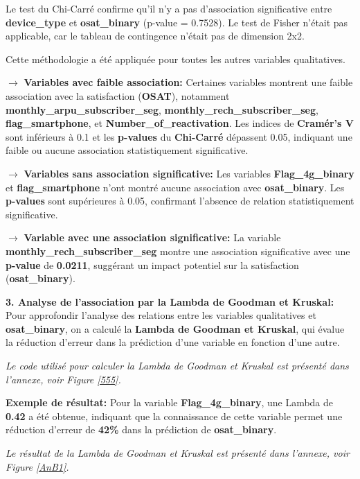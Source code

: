 Le test du Chi-Carré confirme qu'il n'y a pas d'association significative entre \textbf{device\_type} et \textbf{osat\_binary} (p-value = 0.7528). Le test de Fisher n'était pas applicable, car le tableau de contingence n'était pas de dimension 2x2.

Cette méthodologie a été appliquée pour toutes les autres variables qualitatives.

\textbf{\(\rightarrow\)} \textbf{Variables avec faible association:} Certaines variables montrent une faible association avec la satisfaction (\textbf{OSAT}), notamment \textbf{monthly\_arpu\_subscriber\_seg}, \textbf{monthly\_rech\_subscriber\_seg}, \textbf{flag\_smartphone}, et \textbf{Number\_of\_reactivation}. Les indices de \textbf{Cramér's V} sont inférieurs à 0.1 et les \textbf{p-values} du \textbf{Chi-Carré} dépassent 0.05, indiquant une faible ou aucune association statistiquement significative.


\textbf{\(\rightarrow\)} \textbf{Variables sans association significative:} Les variables \textbf{Flag\_4g\_binary} et \textbf{flag\_smartphone} n’ont montré aucune association avec \textbf{osat\_binary}. Les \textbf{p-values} sont supérieures à 0.05, confirmant l'absence de relation statistiquement significative.

\textbf{\(\rightarrow\)} \textbf{Variable avec une association significative:} La variable \textbf{monthly\_rech\_subscriber\_seg} montre une association significative avec une \textbf{p-value} de \textbf{0.0211}, suggérant un impact potentiel sur la satisfaction (\textbf{osat\_binary}).\par

\textbf{3. Analyse de l'association par la Lambda de Goodman et Kruskal:} Pour approfondir l'analyse des relations entre les variables qualitatives et \textbf{osat\_binary}, on a calculé la \textbf{Lambda de Goodman et Kruskal}, qui évalue la réduction d'erreur dans la prédiction d'une variable en fonction d'une autre.

\textit{Le code utilisé pour calculer la Lambda de Goodman et Kruskal est présenté dans l'annexe, voir Figure \ref{555}.}

\textbf{\checkmark Exemple de résultat:} Pour la variable \textbf{Flag\_4g\_binary}, une Lambda de \textbf{0.42} a été obtenue, indiquant que la connaissance de cette variable permet une réduction d'erreur de \textbf{42\%} dans la prédiction de \textbf{osat\_binary}.

\textit{Le résultat de la Lambda de Goodman et Kruskal est présenté dans l'annexe, voir Figure \ref{AnB1}.}


